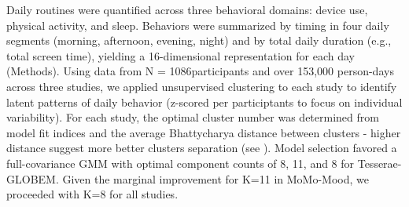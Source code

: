 \documentclass[pdflatex,sn-vancouver,Numbered]{bst/sn-jnl}%
\theoremstyle{thmstyleone}%
\theoremstyle{thmstyletwo}%
\theoremstyle{thmstylethree}%
\newcommand{\totalN}{N = 1086}   %
\begin{document}
Daily routines were quantified across three behavioral domains: device use, physical activity, and sleep. Behaviors were summarized by timing in four daily segments (morning, afternoon, evening, night) and by total daily duration (e.g., total screen time), yielding a 16-dimensional representation for each day (Methods). Using data from \totalN participants and over 153,000 person-days across three studies, we applied unsupervised clustering to each study to identify latent patterns of daily behavior (z-scored per participtants to focus on individual variability). For each study, the optimal cluster number was determined from model fit indices and the average Bhattycharya distance between clusters - higher distance suggest more better clusters separation (see ). Model selection favored a full-covariance GMM with optimal component counts of 8, 11, and 8 for Tesserae-GLOBEM. Given the marginal improvement for K=11 in MoMo-Mood, we proceeded with K=8 for all studies.
\end{document}
